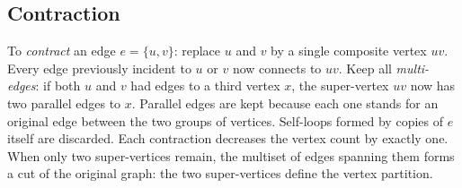 \subsection{Contraction}

To \emph{contract} an edge $e=\{u,v\}$: replace $u$ and $v$ by a single composite vertex $uv$. Every edge previously incident to $u$ or $v$ now connects to $uv$. Keep all \emph{multi-edges}: if both $u$ and $v$ had edges to a third vertex $x$, the super-vertex $uv$ now has two parallel edges to $x$. Parallel edges are kept because each one stands for an original edge between the two groups of vertices. Self-loops formed by copies of $e$ itself are discarded. Each contraction decreases the vertex count by exactly one. When only two super-vertices remain, the multiset of edges spanning them forms a cut of the original graph: the two super-vertices define the vertex partition.

